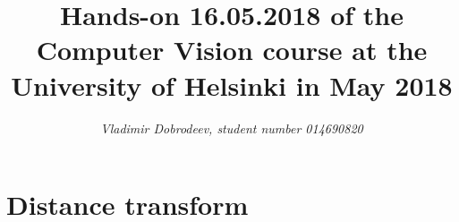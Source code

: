 \documentclass{article}
\begin{document}
\title{Hands-on 16.05.2018 of the Computer Vision course at the
  University of Helsinki in May 2018}

\author{\emph{Vladimir Dobrodeev, student number 014690820}}
\maketitle

\newpage

\section{Distance transform}

\sec
\end{document}
